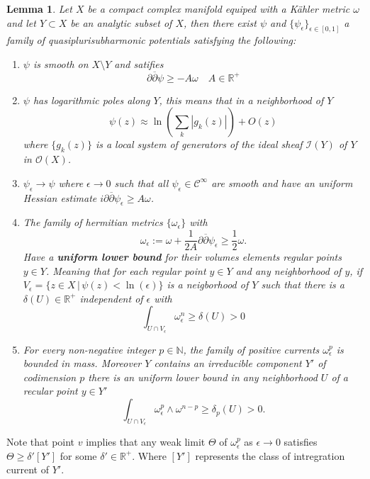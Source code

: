 \documentclass[12pt,twoside,a4paper]{report}
\newtheorem{lemma}[theorem]{Lemma}
\newcommand{\nat}{\ensuremath{ \mathbb N }}
\newcommand{\re}{\ensuremath{\mathbb R }}
\newcommand{\osheaf}{\ensuremath{\mathcal O }}
\newcommand{\csheaf}{\ensuremath{\mathcal C }}
\begin{document}
\begin{lemma}
  Let $X$ be a compact complex manifold equiped with a Kähler metric $\omega$ and let $Y\subset X$ be an analytic subset of $X$, then there exist $\psi$ and $\{\psi_{\epsilon}\}_{\epsilon\in[0,1]}$ a family of quasiplurisubharmonic potentials satisfying the following:
  \begin{enumerate}
    \item[i)] $\psi$ is smooth on $X\setminus Y$ and satifies
          \[
          \partial\overline{\partial}\psi\geq -A\omega\quad A\in\re^{+}
          \]
          
    \item[ii)] $\psi$ has \emph{logarithmic poles} along $Y$, this means that in a neighborhood of $Y$
          \[
            \psi(z)\approx\ln\left(\sum_k|g_k(z)|\right)+O(z)
          \]
          where $\{g_k(z)\}$ is a local system of generators of the ideal sheaf $\mathcal{I}(Y)$ of $Y$ in $\osheaf(X)$.
    \item[iii)] $\psi_{\epsilon}\to\psi$ where $\epsilon\to 0$ such that all $\psi_{\epsilon}\in\csheaf^{\infty}$ are smooth and have an \emph{uniform Hessian estimate} $i\partial\overline{\partial}\psi_{\epsilon}\geq A\omega$.

    \item[iv)] The family of hermitian metrics $\{\omega_{\epsilon}\}$ with
          \[
            \omega_{\epsilon}:=\omega+\frac{1}{2A}\partial\overline{\partial}\psi_{\epsilon}\geq\frac{1}{2}\omega.
          \]
          Have a \textbf{uniform lower bound} for their volumes elements regular points $y\in Y$. Meaning that for each regular point $y\in Y$ and any neighborhood of $y$, if $V_{\epsilon}=\{z\in X\,|\,\psi(z)<\ln(\epsilon)\}$ is a neigborhood of $Y$ such that  there is a $\delta(U)\in\re^{+}$ independent of $\epsilon$ with
          \[
            \int_{U\cap V_{\epsilon}}\omega_{\epsilon}^{n}\geq\delta(U)>0
          \]
    \item[v)] For every non-negative integer $p\in\nat$, the family of positive currents $\omega^p_{\epsilon}$ is bounded in mass. Moreover $Y$ contains an irreducible component $Y'$ of codimension $p$ there is an \emph{uniform lower bound} in any neighborhood $U$ of a recular point $y\in Y'$
          \[
          \int_{U\cap V_{\epsilon}}\omega^p_{\epsilon}\wedge\omega^{n-p}\geq\delta_p(U)>0.
          \]
  \end{enumerate} 
\end{lemma}
Note that point $v$ implies that any weak limit $\Theta$ of $\omega^p_{\epsilon}$ as $\epsilon\to 0$ satisfies $\Theta\geq\delta'[Y']$ for some $\delta'\in\re^{+}$. Where $[Y']$ represents the class of intregration current of $Y'$.
\end{document}
